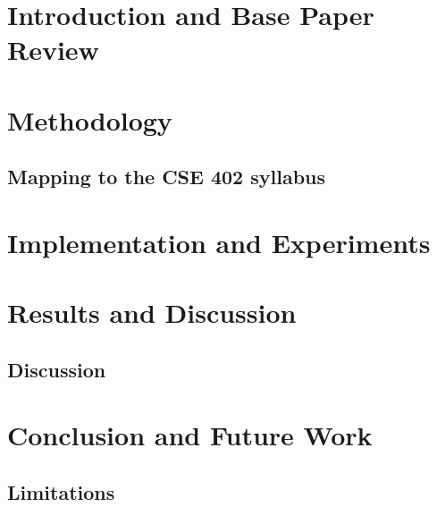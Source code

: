 \documentclass[sigconf,screen=true]{acmart}
\begin{document}

\maketitle

\section{Introduction and Base Paper Review}



\section{Methodology}
\label{sec:methods}


\subsection{Mapping to the CSE 402 syllabus}


\section{Implementation and Experiments}


\section{Results and Discussion}
\label{sec:results}

\subsection{Discussion}


\section{Conclusion and Future Work}

\subsection{Limitations}
\label{sec:threats}






\appendix

\end{document}
